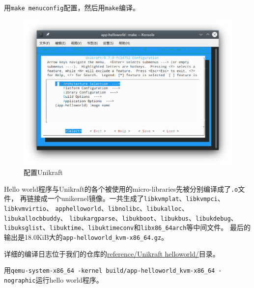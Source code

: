 \documentclass{../runikraft-report}
\begin{document}
用\texttt{make menuconfig}配置，然后用\texttt{make}编译。
\begin{figure}[!hbt]
\centering
\vspace*{-3ex}
\includegraphics[width=0.9\linewidth]{assets/unikraft-menuconfig}
\vspace*{-3ex}
\caption{配置Unikraft}
\label{fig:unikraft-menuconfig}
\end{figure}
Hello world程序与Unikraft的各个被使用的micro-libraries先被分别编译成了\texttt{.o}文件，
再链接成一个unikernel镜像。一共生成了\texttt{libkvmplat}、\texttt{libkvmpci}、\texttt{libkvmvirtio}、
\texttt{apphelloworld}、\texttt{libnolibc}、\texttt{libukalloc}、\texttt{libukallocbbuddy}、
\texttt{libukargparse}、\texttt{libukboot}、\texttt{libukbus}、\texttt{libukdebug}、
\texttt{libuksglist}、\texttt{libuktime}、\texttt{libuktimeconv}和\texttt{libx86\_64arch}等中间文件。
最后的输出是18.0KiB大的\texttt{app-\linebreak helloworld\_kvm-x86\_64.gz}。

详细的编译日志位于我们的仓库的\href{https://github.com/OSH-2022/x-runikraft/tree/d22ccf0c1b248667148fd8953b71b6e0258de6a3/reference/Unikraft%20helloworld}{reference/Unikraft helloworld/}目录。

用\texttt{qemu-system-x86\_64 -kernel build/app-helloworld\_kvm-x86\_64 -nographic}\linebreak 运行hello world程序。
\end{document}

